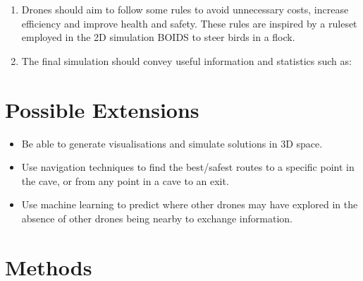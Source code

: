 \documentclass{article}
\begin{document}
\begin{enumerate}
    \item Drones should aim to follow some rules to avoid unnecessary costs, increase efficiency and improve health and safety. These rules are inspired by a ruleset employed in the 2D simulation BOIDS to steer birds in a flock.
    
    \item The final simulation should convey useful information and statistics such as:
    
\end{enumerate}


\section{Possible Extensions}

\begin{itemize}
    \item Be able to generate visualisations and simulate solutions in 3D space.
    \item Use navigation techniques to find the best/safest routes to a specific point in the cave, or from any point in a cave to an exit.
    \item Use machine learning to predict where other drones may have explored in the absence of other drones being nearby to exchange information.
\end{itemize}

\section{Methods}
\end{document}
